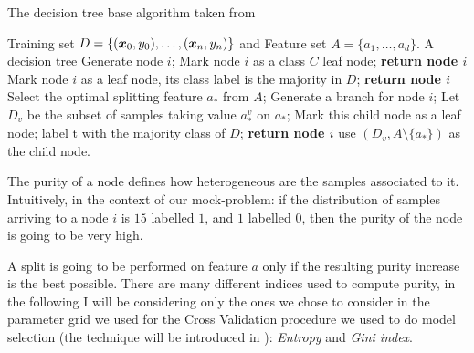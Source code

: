 \begin{algorithm}
	\caption{The decision tree base algorithm taken from
		\cite{ZhouZhi-Hua2021ML}}\label{algo:decision-tree}
	\begin{algorithmic}[1]
		\Require Training set $D = \{(\boldsymbol{x}_0, y_0), \ldots, (\boldsymbol{x}_n, y_n)\}$ and Feature set $A = \{a_1, \ldots,
			a_d\}$.
		\Ensure A decision tree
		\State Generate node $i$;
		\State Mark node $i$ as a class $C$ leaf node; \textbf{return node $i$}
		\EndIf
		\State Mark node $i$ as a leaf node, its class label is
		the majority in $D$;
		\State \textbf{return node $i$}
		\EndIf
		\State Select the optimal splitting feature $a_*$ from $A$;
		\State Generate a branch for node $i$;
		\State Let $D_v$ be the subset of samples taking value $a_*^v$ on $a_*$;
		\State Mark this child node as a leaf node;
		\State label t with the majority class of $D$;
		\textbf{return node $i$}
		\Else
		\State use $(D_v, A \setminus \{a_*\})$ as the child node.
		\EndIf
		\EndFor
		\EndFunction
	\end{algorithmic}
\end{algorithm}

\medskip

The purity of a node defines how heterogeneous are the samples associated to it. Intuitively, in the
context of our mock-problem: if the distribution of samples arriving to a node $i$ is $15$ labelled
$1$, and $1$ labelled $0$, then the purity of the node is going to be very high.

A split is going to be performed on feature $a$ only if the resulting purity increase is the best
possible. There are many different indices used to compute purity, in the following I will be
considering only the ones we chose to consider in the parameter grid we used for the Cross
Validation procedure we used to do model selection (the technique will be introduced in
): \emph{Entropy} and \emph{Gini index}.

